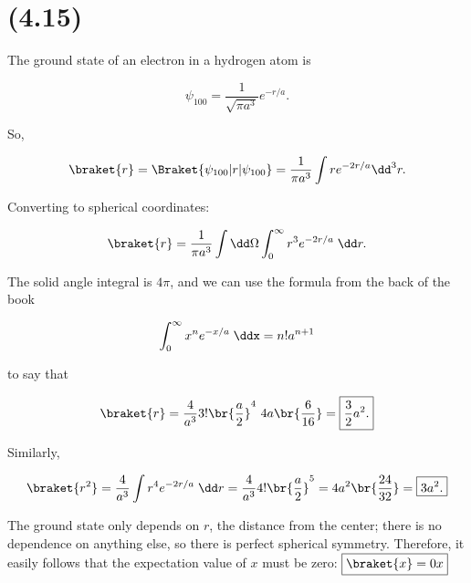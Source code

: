 \section{(4.15)}


\begin{parts}
    



\item The ground state of an electron in a hydrogen atom is

\begin{equation}
    \psi_{100} = \frac{1}{\sqrt{\pi a^3}}e^{-r/a}.
\end{equation}

So,

\begin{equation}
    \braket{r} = \Braket{\psi_{100} | r | \psi_{100}} = \frac{1}{\pi a^3} \int r e^{-2r/a} \dd^3r.
\end{equation}

Converting to spherical coordinates:

\begin{equation}
    \braket{r} = \frac{1}{\pi a^3} \int \dd\Omega \int_0^{\infty} r^3 e^{-2r/a} \;\dd r.
\end{equation}

The solid angle integral is $4\pi$, and we can use the formula from the back of the book

\begin{equation}
    \int_0^{\infty} x^n e^{-x/a} \;\ddx = n! a^{n+1}
\end{equation}

to say that

\begin{equation}
    \braket{r} = \frac{4}{a^3} 3! \br{\frac{a}{2}}^4 \ 4a \br{\frac{6}{16}} = \boxed{\frac{3}{2}a^2.}
\end{equation}

Similarly, 

\begin{equation}
    \braket{r^2} = \frac{4}{a^3} \int r^4 e^{-2r/a} \;\dd r = \frac{4}{a^3} 4! \br{\frac{a}{2}}^5 = 4a^2 \br{\frac{24}{32}} = \boxed{3a^2.}
\end{equation}



\item The ground state only depends on $r$, the distance from the center; there is no dependence on anything else, so there is perfect spherical symmetry. Therefore, it easily follows that the expectation value of $x$ must be zero: $\boxed{\braket{x}=0x}$


\end{parts}

